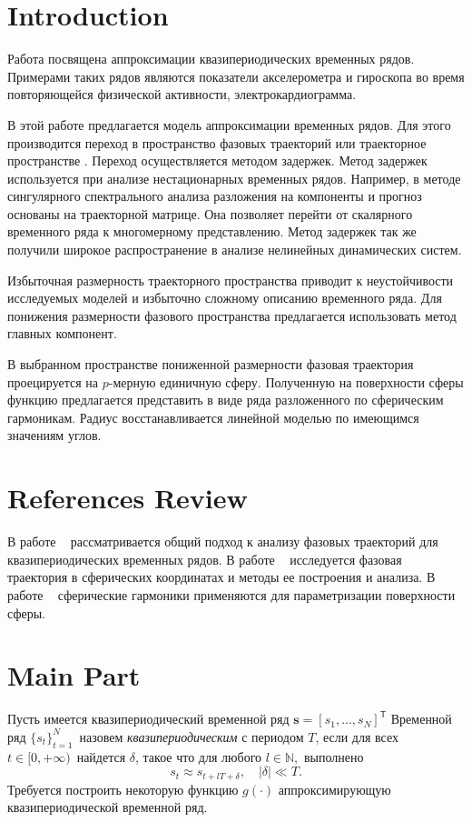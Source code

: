 \section{Introduction}

Работа посвящена аппроксимации квазипериодических временных рядов.
Примерами таких рядов являются показатели акселерометра и гироскопа во время повторяющейся физической активности, электрокардиограмма.
	
В этой работе предлагается модель аппроксимации временных рядов.
Для этого производится переход в пространство фазовых траекторий или траекторное пространстве .
Переход осуществляется методом задержек.
Метод задержек используется при анализе нестационарных временных рядов.
Например, в методе сингулярного спектрального анализа разложения на компоненты и прогноз основаны на траекторной матрице.
Она позволяет перейти от скалярного временного ряда к многомерному представлению.
Метод задержек так же получили широкое распространение в анализе нелинейных динамических систем.

Избыточная размерность траекторного пространства приводит к неустойчивости исследуемых моделей и избыточно сложному описанию временного ряда.
Для понижения размерности фазового пространства предлагается использовать  метод главных компонент.

В выбранном пространстве пониженной размерности фазовая траектория проецируется на $p$-мерную единичную сферу.
Полученную на поверхности сферы функцию предлагается представить в виде ряда разложенного по сферическим гармоникам.
Радиус восстанавливается линейной моделью по имеющимся значениям углов.

\section{References Review}
В работе ~\cite{Motrenko2015} рассматривается общий подход к анализу фазовых траекторий для квазипериодических временных рядов.
В работе ~\cite{Usmanova2020} исследуется фазовая траектория в сферических координатах и методы ее построения и анализа.
В работе ~\cite{Hajarian2015} сферические гармоники применяются для параметризации поверхности сферы.


\section{Main Part}

Пусть имеется квазипериодический временной ряд $\mathbf{s}=[s_1,...,s_N]^{\mathsf{T}}$
Временной ряд $\{s_t\}_{t=1}^N$\, назовем \emph{квазипериодическим} с периодом $T$, если для всех $t\in[0,+\infty)\,$ найдется $\delta$, такое что для любого $l \in \mathbb{N},$ выполнено
\[
   s_{t} \approx s_{t + lT + \delta}, \quad |\delta| \ll T.
\]
Требуется построить некоторую функцию $g(\cdot)$ аппроксимирующую квазипериодической временной ряд.

